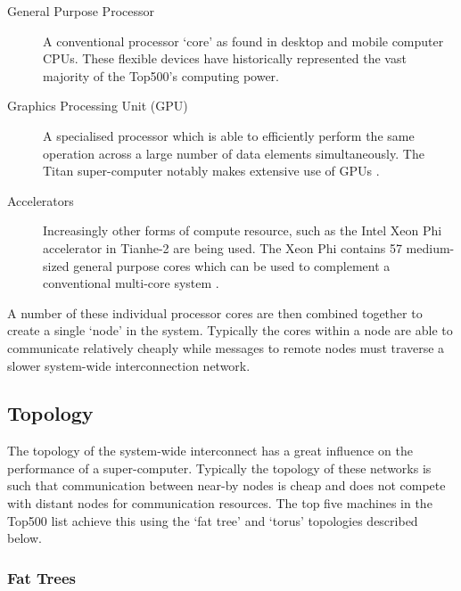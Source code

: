 			\begin{description}
				
				\item[General Purpose Processor] A conventional processor `core' as
				found in desktop and mobile computer CPUs. These flexible devices have
				historically represented the vast majority of the Top500's computing
				power.
				
				\item[Graphics Processing Unit (GPU)] A specialised processor which is
				able to efficiently perform the same operation across a large number of
				data elements simultaneously. The Titan super-computer notably makes
				extensive use of GPUs \cite{bland12}.
				
				\item[Accelerators] Increasingly other forms of compute resource, such
				as the Intel Xeon Phi accelerator in Tianhe-2 are being used. The Xeon
				Phi contains 57 medium-sized general purpose cores which can be used to
				complement a conventional multi-core system \cite{dongarra13}.
				
			\end{description}
			
			A number of these individual processor cores are then combined together to
			create a single `node' in the system. Typically the cores within a node
			are able to communicate relatively cheaply while messages to remote nodes
			must traverse a slower system-wide interconnection network.
		
		\subsection{Topology}
			
			The topology of the system-wide interconnect has a great influence on the
			performance of a super-computer. Typically the topology of these networks
			is such that communication between near-by nodes is cheap and does not
			compete with distant nodes for communication resources. The top five
			machines in the Top500 list achieve this using the `fat tree' and `torus'
			topologies described below.
			
			\subsubsection{Fat Trees}
				

